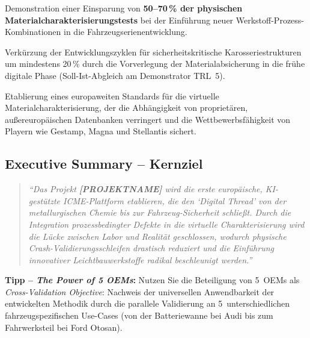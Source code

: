 \documentclass[12pt,a4paper]{article}
\begin{document}
\begin{description}[leftmargin=*, style=nextline]
  \item[IO\,1: Reduktion physischer Ressourcen]
    Demonstration einer Einsparung von \textbf{50--70\,\% der physischen
    Materialcharakterisierungstests} bei der Einführung neuer
    Werkstoff-Prozess-Kombinationen in die Fahrzeugserienentwicklung.

  \item[IO\,2: Beschleunigung der Time-to-Market]
    Verkürzung der Entwicklungszyklen für sicherheitskritische
    Karosseriestrukturen um mindestens 20\,\% durch die Vorverlegung der
    Materialabsicherung in die frühe digitale Phase (Soll-Ist-Abgleich am
    Demonstrator TRL~5).

  \item[IO\,3: Stärkung der europäischen Souveränität]
    Etablierung eines europaweiten Standards für die virtuelle
    Materialcharakterisierung, der die Abhängigkeit von proprietären,
    außereuropäischen Datenbanken verringert und die Wettbewerbsfähigkeit von
    Playern wie Gestamp, Magna und Stellantis sichert.
\end{description}

\subsection{Executive Summary -- Kernziel}

\begin{quote}
  \emph{"`Das Projekt \textbf{[PROJEKTNAME]} wird die erste europäische,
  KI-gestützte ICME-Plattform etablieren, die den `Digital Thread' von der
  metallurgischen Chemie bis zur Fahrzeug-Sicherheit schließt. Durch die
  Integration prozessbedingter Defekte in die virtuelle Charakterisierung
  wird die Lücke zwischen Labor und Realität geschlossen, wodurch physische
  Crash-Validierungsschleifen drastisch reduziert und die Einführung
  innovativer Leichtbauwerkstoffe radikal beschleunigt werden."'}
\end{quote}

\textbf{Tipp -- \emph{The Power of 5 OEMs}:} Nutzen Sie die Beteiligung von
5~OEMs als \emph{Cross-Validation Objective}: Nachweis der universellen
Anwendbarkeit der entwickelten Methodik durch die parallele Validierung an
5~unterschiedlichen fahrzeugspezifischen Use-Cases (von der Batteriewanne
bei Audi bis zum Fahrwerksteil bei Ford Otosan).
\end{document}
